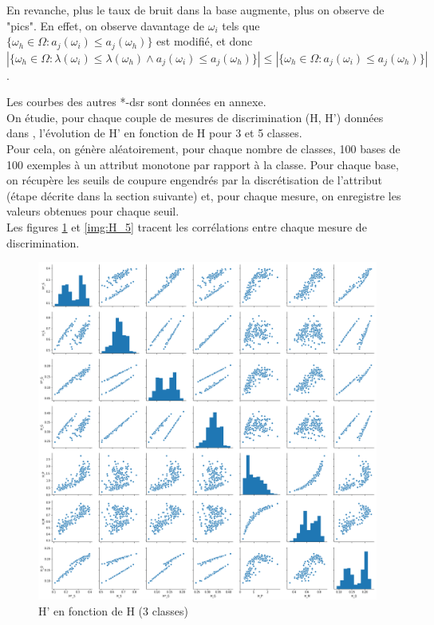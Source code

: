 \documentclass[a4paper]{article}
\begin{document}
\noindent En revanche, plus le taux de bruit dans la base augmente, plus on observe de
"pics". En effet, on observe davantage de $\omega_i$ tels que $ \{\omega_h \in
\Omega : a_j(\omega_i) \leq a_j(\omega_h)\} $ est modifié, et donc  $|
\{\omega_h \in \Omega : \lambda(\omega_i) \leq \lambda(\omega_h) \land
a_j(\omega_i) \leq a_j(\omega_h)\} | \leq | \{\omega_h \in \Omega :
a_j(\omega_i) \leq a_j(\omega_h)\} |$.

\noindent Les courbes des autres *-dsr sont données en annexe.\\

On étudie, pour chaque couple de mesures de discrimination (H, H') données dans
\cite{marsala-rank}, l'évolution de H' en fonction de H pour 3 et 5 classes.
\\ Pour cela, on génère aléatoirement, pour chaque nombre de classes, 100 bases
de 100 exemples à un attribut monotone par rapport à la classe. Pour chaque
base, on récupère les seuils de coupure engendrés par la discrétisation de
l'attribut (étape décrite dans la section suivante) et, pour
chaque mesure, on enregistre les valeurs obtenues pour chaque seuil.\\ Les
figures \ref{img:H_3} et \ref{img:H_5} tracent les corrélations
entre chaque mesure de discrimination. \\

\begin{figure}[H]
	\center 
	\includegraphics[width=1\textwidth]{images/H_3.png}
    \caption{H' en fonction de H (3 classes)}
    \label{img:H_3}
\end{figure}
\end{document}
